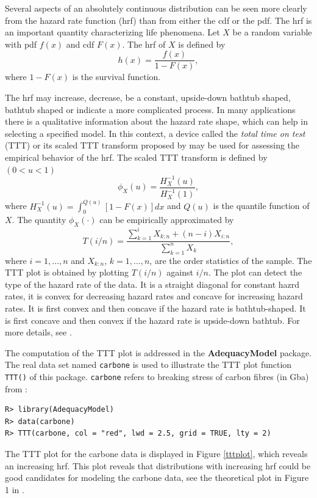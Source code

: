 \documentclass[10pt,letterpaper]{article}
\begin{document}
Several aspects of an absolutely continuous distribution can be seen more clearly from the hazard rate function (hrf) than from either the cdf or the pdf.
The hrf is an important quantity characterizing life phenomena.
Let $X$ be a random variable with pdf $f(x)$ and cdf $F(x)$.
The hrf of $X$ is defined by
\begin{equation*}
h(x) = \frac{f(x)}{1-F(x)},
\end{equation*}
where $1 - F(x)$ is the survival function.

The hrf may  increase, decrease, be a constant, upside-down bathtub shaped, bathtub shaped or indicate a more complicated process.
In many applications there is a qualitative information about the hazard rate shape,
which can help in selecting a specified model.
In this context, a device called the {\it total time on test} (TTT) or its scaled TTT transform proposed by \cite{aarset1987} may be used for
assessing the empirical behavior of the hrf.
The scaled TTT transform is defined by $(0 < u < 1)$ $$\phi_X(u) = \frac{H^{-1}_{X}(u)}{H^{-1}_{X}(1)},$$
where $H^{-1}_{X}(u) = \int_{0}^{Q(u)}[1-F(x)]dx$ and $Q(u)$ is the quantile function of $X$.
The quantity $\phi_X(\cdot)$ can be empirically approximated by
$$T(i/n) = \frac{\sum_{k=1}^i X_{k:n} + (n - i)X_{i:n}}{\sum_{k=1}^n X_{k}},$$
where $i = 1, \ldots, n$ and $X_{k:n}$, $k=1,\ldots,n$, are the order statistics of the sample.
The TTT plot is obtained by plotting $T(i/n)$ against $i/n$.
The plot can detect the type of the hazard rate of the data.
It is a straight diagonal for constant hazrd rates,
it is convex for decreasing hazard rates and concave for increasing hazard rates.
It is first convex and then concave if the hazard rate is bathtub-shaped.
It is first concave and then convex if the hazard rate is upside-down bathtub.
For more details, see \cite{aarset1987}.

The computation of the TTT plot is addressed in the \textbf{AdequacyModel} package.
The real data set named \texttt{carbone} is used to illustrate
the TTT plot function \texttt{TTT()} of this package.
\texttt{carbone} refers to breaking stress of carbon fibres (in Gba) from \cite{nicholspadgett2006}:
\begin{verbatim}
R> library(AdequacyModel)
R> data(carbone)
R> TTT(carbone, col = "red", lwd = 2.5, grid = TRUE, lty = 2)
\end{verbatim}
The TTT plot for the carbone data \cite{nicholspadgett2006} is displayed in Figure \ref{tttplot}, which reveals an increasing hrf.
This plot reveals that distributions with increasing hrf could be good candidates for modeling the carbone data, see the theoretical
plot in Figure 1 in \cite{aarset1987}.
\end{document}
